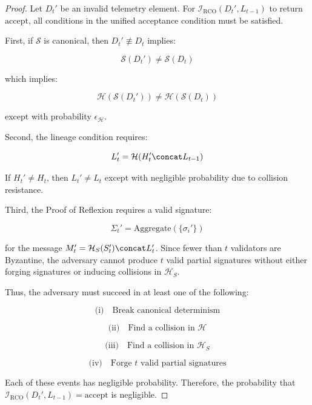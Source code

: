 \begin{proof}
Let $D_t'$ be an invalid telemetry element. For $\mathcal{I}_{\text{RCO}}(D_t', L_{t-1})$ to return $\text{accept}$, all conditions in the unified acceptance condition must be satisfied.

First, if $\mathcal{S}$ is canonical, then $D_t' \not\equiv D_t$ implies:

\[
\mathcal{S}(D_t') \neq \mathcal{S}(D_t)
\]

which implies:

\[
\mathcal{H}(\mathcal{S}(D_t')) \neq \mathcal{H}(\mathcal{S}(D_t))
\]

except with probability $\epsilon_{\mathcal{H}}$.

Second, the lineage condition requires:

\[
L_t' = \mathcal{H}(H_t' \concat L_{t-1})
\]

If $H_t' \neq H_t$, then $L_t' \neq L_t$ except with negligible probability due to collision resistance.

Third, the Proof of Reflexion requires a valid signature:

\[
\Sigma_t' = \text{Aggregate}(\{\sigma_i'\})
\]

for the message $M_t' = \mathcal{H}_S(S_t') \concat L_t'$. Since fewer than $t$ validators are Byzantine, the adversary cannot produce $t$ valid partial signatures without either forging signatures or inducing collisions in $\mathcal{H}_S$.

Thus, the adversary must succeed in at least one of the following:

\begin{equation}
\text{(i)} \quad \text{Break canonical determinism}
\end{equation}

\begin{equation}
\text{(ii)} \quad \text{Find a collision in } \mathcal{H}
\end{equation}

\begin{equation}
\text{(iii)} \quad \text{Find a collision in } \mathcal{H}_S
\end{equation}

\begin{equation}
\text{(iv)} \quad \text{Forge } t \text{ valid partial signatures}
\end{equation}

Each of these events has negligible probability. Therefore, the probability that $\mathcal{I}_{\text{RCO}}(D_t', L_{t-1}) = \text{accept}$ is negligible.
\end{proof}

